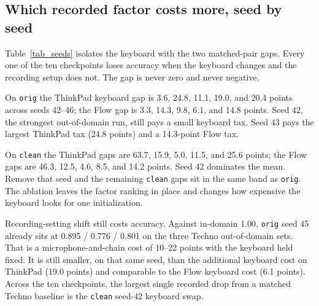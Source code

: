 \documentclass[pdflatex,sn-mathphys-num,iicol]{sn-jnl}
\begin{document}
\subsection{Which recorded factor costs more, seed by seed}\label{subsec_res_factors}

Table~\ref{tab_seeds} isolates the keyboard with the two matched-pair gaps. Every one of the ten checkpoints loses accuracy when the keyboard changes and the recording setup does not. The gap is never zero and never negative.

On \texttt{orig} the ThinkPad keyboard gap is 3.6, 24.8, 11.1, 19.0, and 20.4 points across seeds 42--46; the Flow gap is 3.3, 14.3, 9.8, 6.1, and 14.8 points. Seed 42, the strongest out-of-domain run, still pays a small keyboard tax. Seed 43 pays the largest ThinkPad tax (24.8 points) and a 14.3-point Flow tax.

On \texttt{clean} the ThinkPad gaps are 63.7, 15.9, 5.0, 11.5, and 25.6 points; the Flow gaps are 46.3, 12.5, 4.6, 8.5, and 14.2 points. Seed 42 dominates the mean. Remove that seed and the remaining \texttt{clean} gaps sit in the same band as \texttt{orig}. The ablation leaves the factor ranking in place and changes how expensive the keyboard looks for one initialization.

Recording-setting shift still costs accuracy. Against in-domain 1.00, \texttt{orig} seed 45 already sits at 0.895 / 0.776 / 0.801 on the three Techno out-of-domain sets. That is a microphone-and-chain cost of 10--22 points with the keyboard held fixed. It is still smaller, on that same seed, than the additional keyboard cost on ThinkPad (19.0 points) and comparable to the Flow keyboard cost (6.1 points). Across the ten checkpoints, the largest single recorded drop from a matched Techno baseline is the \texttt{clean} seed-42 keyboard swap.

\end{document}
